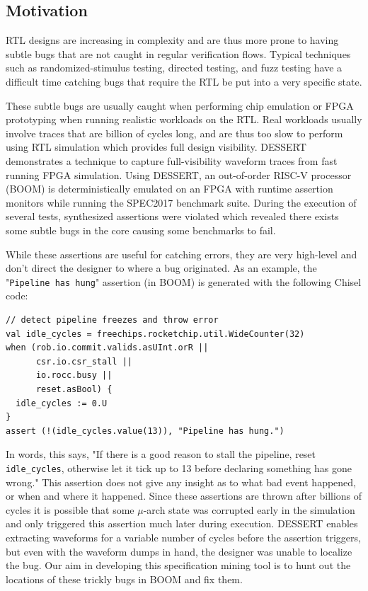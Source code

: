 \documentclass[acmlarge,11pt]{acmart}
\begin{document}
\subsection{Motivation}
RTL designs are increasing in complexity and are thus more prone to having subtle bugs that are not caught in regular verification flows. Typical techniques such as randomized-stimulus testing, directed testing, and fuzz testing have a difficult time catching bugs that require the RTL be put into a very specific state.

These subtle bugs are usually caught when performing chip emulation or FPGA prototyping when running realistic workloads on the RTL.
Real workloads usually involve traces that are billion of cycles long, and are thus too slow to perform using RTL simulation which provides full design visibility.
DESSERT\cite{Kim_2018} demonstrates a technique to capture full-visibility waveform traces from fast running FPGA simulation.
Using DESSERT, an out-of-order RISC-V processor (BOOM\cite{Celio_2015}) is deterministically emulated on an FPGA with runtime assertion monitors while running the SPEC2017 benchmark suite.
During the execution of several tests, synthesized assertions were violated which revealed there exists some subtle bugs in the core causing some benchmarks to fail.

While these assertions are useful for catching errors, they are very high-level and don't direct the designer to where a bug originated.
As an example, the "\texttt{Pipeline has hung}" assertion (in BOOM) is generated with the following Chisel code:

\begin{verbatim}
// detect pipeline freezes and throw error
val idle_cycles = freechips.rocketchip.util.WideCounter(32)
when (rob.io.commit.valids.asUInt.orR ||
      csr.io.csr_stall ||
      io.rocc.busy ||
      reset.asBool) {
  idle_cycles := 0.U
}
assert (!(idle_cycles.value(13)), "Pipeline has hung.")
\end{verbatim}

In words, this says, "If there is a good reason to stall the pipeline, reset \texttt{idle\_cycles}, otherwise let it tick up to 13 before declaring something has gone wrong."
This assertion does not give any insight as to what bad event happened, or when and where it happened.
Since these assertions are thrown after billions of cycles it is possible that some $\mu$-arch state was corrupted early in the simulation and only triggered this assertion much later during execution.
DESSERT enables extracting waveforms for a variable number of cycles before the assertion triggers, but even with the waveform dumps in hand, the designer was unable to localize the bug.
Our aim in developing this specification mining tool is to hunt out the locations of these trickly bugs in BOOM and fix them.
\end{document}
